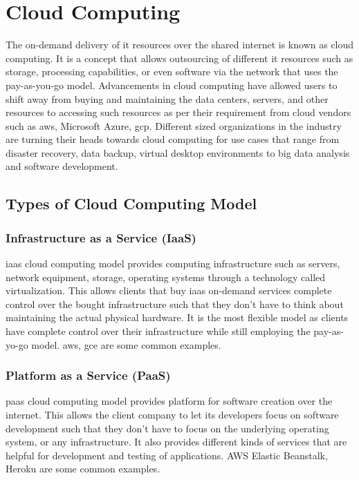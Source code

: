\documentclass{home_assignment}
\begin{document}
\tableofcontents
\clearpage
{}
{}
\listoffigures
\clearpage
{}
{}
\printglossary[type=\acronymtype,nonumberlist,title={List of Abbreviations}]
\clearpage
{}
\section{Cloud Computing}
The on-demand delivery of \acrfull{it} resources over the shared internet is known as cloud computing. It is a concept that allows outsourcing of different \acrshort{it} resources such as storage, processing capabilities, or even software via the network that uses the pay-as-you-go model. Advancements in cloud computing have allowed users to shift away from buying and maintaining the data centers, servers, and other resources to accessing such resources as per their requirement from cloud vendors such as \acrfull{aws}, Microsoft Azure, \acrfull{gcp}. Different sized organizations in the industry are turning their heads towards cloud computing for use cases that range from disaster recovery, data backup, virtual desktop environments to big data analysis and software development.

\subsection{Types of Cloud Computing Model}
\subsubsection{Infrastructure as a Service (IaaS)}
\acrfull{iaas} cloud computing model provides computing infrastructure such as servers, network equipment, storage, operating systems through a technology called virtualization. This allows clients that buy \acrshort{iaas} on-demand services complete control over the bought infrastructure such that they don't have to think about maintaining the actual physical hardware. It is the most flexible model as clients have complete control over their infrastructure while still employing the pay-as-yo-go model. \acrfull{aws}, \acrfull{gce} are some common examples.
\subsubsection{Platform as a Service (PaaS)}
\acrfull{paas} cloud computing model provides platform for software creation over the internet. This allows the client company to let its developers focus on software development such that they don't have to focus on the underlying operating system, or any infrastructure. It also provides different kinds of services that are helpful for development and testing of applications. AWS Elastic Beanstalk, Heroku are some common examples.  
\end{document}
